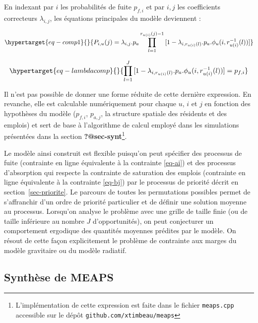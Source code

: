 \documentclass[
  10pt,
  a4paper,
  numbers=noendperiod,
  DIV=9]{scrreprt}
\begin{document}
En indexant par \(i\) les probabilités de fuite \(p_{f,i}\) et par
\(i,j\) les coefficients correcteurs \(\lambda_{i,j}\), les équations
principales du modèle deviennent :

\begin{equation}\protect\hypertarget{eq-comp1}{}{
P_{i, u}(j) = \lambda_{i,j} . p_{a} \prod _{l=1} ^{r_{u(i)}(j)-1} {[1-\lambda_{i,r_{u(i)}(l)}. p_{a}.\phi_u(i,r_{u(i)}^{-1}(l))]}
}\label{eq-comp1}\end{equation}

\begin{equation}\protect\hypertarget{eq-lambdacomp}{}{
\prod _{l=1} ^{J} {[1-\lambda_{i,r_{u(i)}(l)}.p_{a}.\phi_u(i,r_{u(i)}^{-1}(l))]}= p_{f,i}
}\label{eq-lambdacomp}\end{equation}

Il n'est pas possible de donner une forme réduite de cette dernière
expression. En revanche, elle est calculable numériquement pour chaque
\(u\), \(i\) et \(j\) en fonction des hypothèses du modèle (\(p_{f,i}\),
\(p_{a,j}\), la structure spatiale des résidents et des emplois) et sert
de base à l'algorithme de calcul employé dans les simulations présentées
dans la section \textbf{?@sec-synt}\footnote{L'implémentation de cette
  expression est faite dans le fichier \texttt{meaps.cpp} accessible sur
  le dépôt \texttt{github.com/xtimbeau/meaps}}.

Le modèle ainsi construit est flexible puisqu'on peut spécifier des
processus de fuite (contrainte en ligne équivalente à la contrainte
\ref{eq-ai}) et des processus d'absorption qui respecte la contrainte de
saturation des emplois (contrainte en ligne équivalente à la contrainte
\ref{eq-bj}) par le processus de priorité décrit en
section~\ref{sec-priorite}. Le parcours de toutes les permutations
possibles permet de s'affranchir d'un ordre de priorité particulier et
de définir une solution moyenne au processus. Lorsqu'on analyse le
problème avec une grille de taille finie (ou de taille inférieure au
nombre \(J\) d'opportunités), on peut conjecturer un comportement
ergodique des quantités moyennes prédites par le modèle. On résout de
cette façon explicitement le problème de contrainte aux marges du modèle
gravitaire ou du modèle radiatif.

\hypertarget{synthuxe8se-de-meaps}{%
\subsection{Synthèse de MEAPS}\label{synthuxe8se-de-meaps}}
\end{document}

